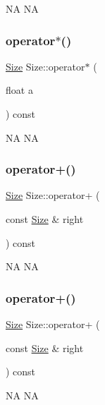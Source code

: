 NA  NA \mbox{\label{classSize_aa927f929575591818d750e79453601c3}} 
\subsubsection{\texorpdfstring{operator$\ast$()}{operator*()}\hspace{0.1cm}{\footnotesize\ttfamily [2/2]}}
{\footnotesize\ttfamily \hyperlink{classSize}{Size} Size\+::operator$\ast$ (\begin{DoxyParamCaption}\item[{float}]{a }\end{DoxyParamCaption}) const}

NA  NA \mbox{\label{classSize_a5ea246140e8dcee5af256b751eb58bd0}} 
\subsubsection{\texorpdfstring{operator+()}{operator+()}\hspace{0.1cm}{\footnotesize\ttfamily [1/2]}}
{\footnotesize\ttfamily \hyperlink{classSize}{Size} Size\+::operator+ (\begin{DoxyParamCaption}\item[{const \hyperlink{classSize}{Size} \&}]{right }\end{DoxyParamCaption}) const}

NA  NA \mbox{\label{classSize_a5ea246140e8dcee5af256b751eb58bd0}} 
\subsubsection{\texorpdfstring{operator+()}{operator+()}\hspace{0.1cm}{\footnotesize\ttfamily [2/2]}}
{\footnotesize\ttfamily \hyperlink{classSize}{Size} Size\+::operator+ (\begin{DoxyParamCaption}\item[{const \hyperlink{classSize}{Size} \&}]{right }\end{DoxyParamCaption}) const}

NA  NA \mbox{\label{classSize_a591e1fd7d3b14db4da48a836437becd9}} 
